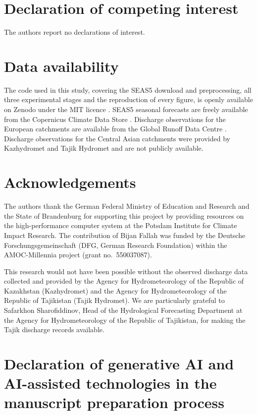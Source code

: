 \documentclass[review,12pt,authoryear]{elsarticle}
\begin{document}
\section*{Declaration of competing interest}

The authors report no declarations of interest.

\section*{Data availability}

The code used in this study, covering the SEAS5 download and preprocessing, all three experimental stages and the reproduction of every figure, is openly available on Zenodo under the MIT licence \citep{pinedaschwarz2026code}. SEAS5 seasonal forecasts are freely available from the Copernicus Climate Data Store \citep{copernicus2018}. Discharge observations for the European catchments are available from the Global Runoff Data Centre \citep{grdc2026}. Discharge observations for the Central Asian catchments were provided by Kazhydromet and Tajik Hydromet and are not publicly available.

\section*{Acknowledgements}

The authors thank the German Federal Ministry of Education and Research and the State of Brandenburg for supporting this project by providing resources on the high-performance computer system at the Potsdam Institute for Climate Impact Research. 
The contribution of Bijan Fallah was funded by the Deutsche Forschungsgemeinschaft (DFG, German Research Foundation) within the AMOC-Millennia project (grant no.~550037087).

This research would not have been possible without the observed discharge data collected and provided by the Agency for Hydrometeorology of the Republic of Kazakhstan (Kazhydromet) and the Agency for Hydrometeorology of the Republic of Tajikistan (Tajik Hydromet). We are particularly grateful to Safarkhon Sharofiddinov, Head of the Hydrological Forecasting Department at the Agency for Hydrometeorology of the Republic of Tajikistan, for making the Tajik discharge records available.

\section*{Declaration of generative AI and AI-assisted technologies in the manuscript preparation process}
\end{document}
